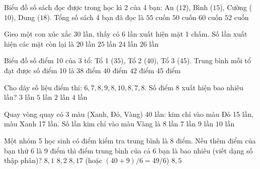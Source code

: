 \begin{ex} %
Biểu đồ số sách đọc được trong học kì 2 của 4 bạn: An ($12$), Bình ($15$), Cường ($10$), Dung ($18$). Tổng số sách 4 bạn đã đọc là
\choice
{\True $55$ cuốn}
{$50$ cuốn}
{$60$ cuốn}
{$52$ cuốn}
\end{ex}

\begin{ex} %
Gieo một con xúc xắc 30 lần, thấy có 6 lần xuất hiện mặt 1 chấm. Số lần xuất hiện các mặt còn lại là
\choice
{$20$ lần}
{$25$ lần}
{\True $24$ lần}
{$26$ lần}
\end{ex}

\begin{ex} %
Biểu đồ số điểm 10 của 3 tổ: Tổ 1 ($35$), Tổ 2 ($40$), Tổ 3 ($45$). Trung bình mỗi tổ đạt được số điểm 10 là
\choice
{$38$ điểm}
{\True $40$ điểm}
{$42$ điểm}
{$45$ điểm}
\end{ex}

\begin{ex} %
Cho dãy số liệu điểm thi: $6, 7, 8, 9, 8, 10, 8, 7, 8$. Số điểm 8 xuất hiện bao nhiêu lần?
\choice
{$3$ lần}
{$5$ lần}
{$2$ lần}
{\True $4$ lần}
\end{ex}

\begin{ex} %
Quay vòng quay có 3 màu (Xanh, Đỏ, Vàng) 40 lần: kim chỉ vào màu Đỏ 15 lần, màu Xanh 17 lần. Số lần kim chỉ vào màu Vàng là
\choice
{\True $8$ lần}
{$7$ lần}
{$9$ lần}
{$10$ lần}
\end{ex}

\begin{ex} %
Một nhóm 5 học sinh có điểm kiểm tra trung bình là 8 điểm. Nếu thêm điểm của bạn thứ 6 là 9 điểm thì điểm trung bình của cả 6 bạn là bao nhiêu (viết dạng số thập phân)?
\choice
{$8{,}1$}
{$8{,}2$}
{\True $8{,}17$ (hoặc $(40+9)/6 = 49/6$)}
{$8{,}5$}
\end{ex}

